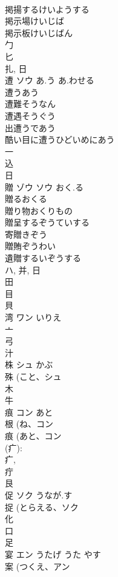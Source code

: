\documentclass[8pt]{extreport}
\begin{document}
\begin{CJK}{UTF8}{min}
\\	掲揚するけいようする
\\	掲示場けいじば
\\	掲示板けいじばん
\\	勹 
\\	匕 
\\	扎, 日 
\\	遭	ソウ	あ.う あ.わせる	
\\	遭うあう 
\\	遭難そうなん 
\\	遭遇そうぐう 
\\	出遭うであう 
\\	酷い目に遭うひどいめにあう 
\\	一 
\\	込 
\\	日 
\\	贈	ゾウ ソウ	おく.る	
\\	贈るおくる
\\	贈り物おくりもの
\\	贈呈するぞうていする
\\	寄贈きぞう
\\	贈賄ぞうわい
\\	遺贈するいぞうする
\\	ハ, 并, 日 
\\	田 
\\	目 
\\	貝 
\\	湾	ワン	いりえ	
\\	亠 
\\	弓 
\\	汁 
\\	株	シュ	かぶ	
\\	殊 (こと、シュ 
\\	木 
\\	牛 
\\	痕	コン	あと	
\\	根 (ね、コン 
\\	痕 (あと、コン 
\\	(疒): 
\\	疒, 
\\	疔 
\\	艮 
\\	促	ソク	うなが.す	
\\	捉 (とらえる、ソク 
\\	化 
\\	口 
\\	足 
\\	宴	エン	うたげ うた やす	
\\	案 (つくえ、アン 

\end{CJK}
\end{document}
